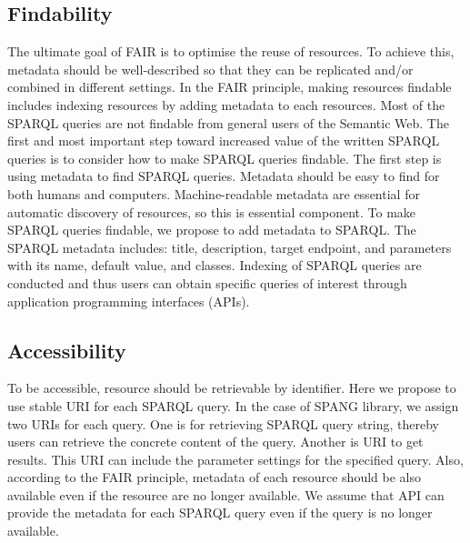 \documentclass[runningheads]{llncs}
\begin{document}
\subsection{Findability}
The ultimate goal of FAIR is to optimise the reuse of resources. 
To achieve this, metadata should be well-described so that they can be replicated and/or combined in different settings.
In the FAIR principle, making resources findable includes indexing resources by adding metadata to each resources. 
Most of the SPARQL queries are not findable from general users of the Semantic Web. 
The first and most important step toward increased value of the written SPARQL queries is to consider how to make SPARQL queries findable.
The first step is using metadata to find SPARQL queries. 
Metadata should be easy to find for both humans and computers. Machine-readable metadata are essential for automatic discovery of resources, so this is essential component.
To make SPARQL queries findable, we propose to add metadata to SPARQL.
The SPARQL metadata includes: title, description, target endpoint, and parameters with its name, default value, and classes.
Indexing of SPARQL queries are conducted and thus users can obtain specific queries of interest through application programming interfaces (APIs).

\subsection{Accessibility}
To be accessible, resource should be retrievable by identifier.
Here we propose to use stable URI for each SPARQL query.
In the case of SPANG library, we assign two URIs for each query. 
One is for retrieving SPARQL query string, thereby users can retrieve the concrete content of the query. 
Another is URI to get results. This URI can include the parameter settings for the specified query.
Also, according to the FAIR principle, metadata of each resource should be also available even if the resource are no longer available. 
We assume that API can provide the metadata for each SPARQL query even if the query is no longer available.
\end{document}
